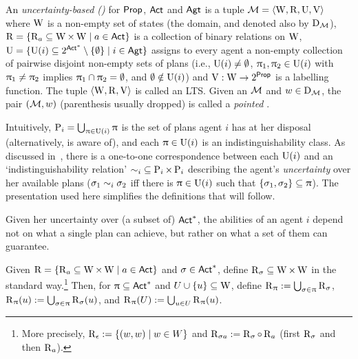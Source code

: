 \medskip

\begin{definition}\label{def:ults}
An \emph{uncertainty-based \lts (\ults)} for ${\rm \sf Prop}$, ${\rm \sf Act}$ and ${\rm \sf Agt}$ is a tuple $\mathcal{M} = \langle \operatorname{W},\operatorname{R},\operatorname{U},\operatorname{V} \rangle$ where $\operatorname{W}$ is a non-empty set of states (the domain, and denoted also by $\operatorname{D}_{\mathcal{M}}$), $\operatorname{R} = \{ \operatorname{R}_a \subseteq \operatorname{W} \times \operatorname{W} \mid a \in {\rm \sf Act} \}$ is a collection of binary relations on $\operatorname{W}$, $\operatorname{U} = \{ \operatorname{U}(i) \subseteq 2^{{\rm \sf Act}^*}\setminus \{ \emptyset \} \mid i \in {\rm \sf Agt} \}$ assigns to every agent a non-empty collection of pairwise disjoint non-empty sets of plans (i.e., $\operatorname{U}(i) \neq \emptyset$, $\uppi_1, \uppi_2 \in \operatorname{U}(i)$ with $\uppi_1 \neq \uppi_2$ implies $\uppi_1 \cap \uppi_2 = \emptyset$, and $\emptyset \notin \operatorname{U}(i)$) and $\operatorname{V}:\operatorname{W} \to 2^{\rm \sf Prop}$ is a labelling function. The tuple $\langle \operatorname{W},\operatorname{R},\operatorname{V} \rangle$ is called an LTS. Given an \ults $\mathcal{M}$ and $w \in \operatorname{D}_{\mathcal{M}}$, the pair $(\mathcal{M},w)$ (parenthesis usually dropped) is called a \emph{pointed \ults}.
\end{definition}
\medskip


Intuitively, $\operatorname{P}_{i} = \bigcup_{\uppi \in \operatorname{U}(i)} \uppi$ is the set of plans agent $i$ has at her disposal (alternatively, is aware of), and each $\uppi \in \operatorname{U}(i)$ is an indistinguishability class. As discussed in~\cite{AFSVQ21}, there is a one-to-one correspondence between each $\operatorname{U}(i)$ and an `indistinguishability relation' ${\sim_i} \subseteq \operatorname{P}_{i} \times \operatorname{P}_{i}$ describing the agent's \emph{uncertainty} over her available plans ($\sigma_1 \sim_i \sigma_2$ iff there is $\uppi \in \operatorname{U}(i)$ such that $\{ \sigma_1, \sigma_2 \} \subseteq \uppi$). The presentation used here simplifies the definitions that will follow.

Given her uncertainty over (a subset of) ${\rm \sf Act}^*$, the abilities of an agent $i$ depend not on what a single plan can achieve, but rather on what a set of them can guarantee.

\medskip

\begin{definition}
Given $\operatorname{R}=\{ \operatorname{R}_a \subseteq \operatorname{W} \times \operatorname{W} \mid a\in{\rm \sf Act} \}$ and $\sigma \in {\rm \sf Act}^*$, define $\operatorname{R}_\sigma \subseteq \operatorname{W} \times \operatorname{W}$ in the standard way.\footnote{More precisely, $\operatorname{R}_\epsilon := \{ (w,w) \mid w \in W \}$ and $\operatorname{R}_{{\sigma}a} := \operatorname{R}_\sigma \circ \operatorname{R}_a$ (first $\operatorname{R}_{\sigma}$ and then $\operatorname{R}_a$).} Then, for $\uppi \subseteq {\rm \sf Act}^*$ and $U \cup \{u \} \subseteq \operatorname{W}$, define $\operatorname{R}_\uppi := \bigcup_{\sigma \in \uppi} \operatorname{R}_{\sigma}$, $\operatorname{R}_{\uppi}(u) := \bigcup_{\sigma \in \uppi} \operatorname{R}_\sigma(u)$, and $\operatorname{R}_{\uppi}(U) := \bigcup_{u \in U} \operatorname{R}_{\uppi}(u)$.
\end{definition}

